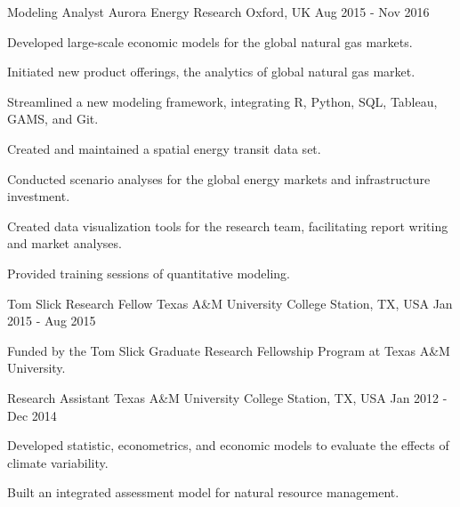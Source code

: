 \begin{cventries}
    \cventry
    {Modeling Analyst} %
    {Aurora Energy Research} %
    {Oxford, UK} %
    {Aug 2015 - Nov 2016} %
    {
        \begin{cvitems} %
            \item {Developed large-scale economic models for the global natural gas markets.}
            \item {Initiated new product offerings, the analytics of global natural gas market.}
            \item {Streamlined a new modeling framework, integrating R, Python, SQL, Tableau, GAMS, and Git.}
            \item {Created and maintained a spatial energy transit data set.}
            \item {Conducted scenario analyses for the global energy markets and infrastructure investment.}
            \item {Created data visualization tools for the research team, facilitating report writing and market analyses.}
            \item {Provided training sessions of quantitative modeling.}
        \end{cvitems}
    }

    \cventry
    {Tom Slick Research Fellow} %
    {Texas A\&M University} %
    {College Station, TX, USA} %
    {Jan 2015 - Aug 2015} %
    {
        \begin{cvitems} %
            \item {Funded by the Tom Slick Graduate Research Fellowship Program at Texas A\&M University.}
        \end{cvitems}
    }

    \cventry
    {Research Assistant} %
    {Texas A\&M University} %
    {College Station, TX, USA} %
    {Jan 2012 - Dec 2014} %
    {
        \begin{cvitems} %
            \item {Developed statistic, econometrics, and economic models to evaluate the effects of climate variability.}
            \item {Built an integrated assessment model for natural resource management.}
        \end{cvitems}
    }


\end{cventries}
